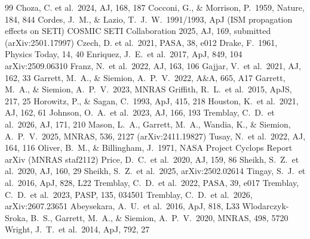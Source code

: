 \documentclass[10pt,twocolumn]{article}
\begin{document}
\begin{thebibliography}{99}
\footnotesize
{} Choza, C. et al.\ 2024, AJ, 168, 187
 Cocconi, G., \& Morrison, P.\ 1959, Nature, 184, 844
 Cordes, J.\ M., \& Lazio, T.\ J.\ W.\ 1991/1993, ApJ (ISM propagation effects on SETI)
 COSMIC SETI Collaboration 2025, AJ, 169, submitted (arXiv:2501.17997)
 Czech, D. et al.\ 2021, PASA, 38, e012
 Drake, F.\ 1961, Physics Today, 14, 40
 Enriquez, J.\ E.\ et al.\ 2017, ApJ, 849, 104
 arXiv:2509.06310
 Franz, N.\ et al.\ 2022, AJ, 163, 106
 Gajjar, V.\ et al.\ 2021, AJ, 162, 33
 Garrett, M.\ A., \& Siemion, A.\ P.\ V.\ 2022, A\&A, 665, A17
 Garrett, M.\ A., \& Siemion, A.\ P.\ V.\ 2023, MNRAS
 Griffith, R.\ L.\ et al.\ 2015, ApJS, 217, 25
 Horowitz, P., \& Sagan, C.\ 1993, ApJ, 415, 218
 Houston, K.\ et al.\ 2021, AJ, 162, 61
 Johnson, O.\ A.\ et al.\ 2023, AJ, 166, 193
 Tremblay, C.\ D.\ et al.\ 2026, AJ, 171, 210
 Mason, L.\ A., Garrett, M.\ A., Wandia, K., \& Siemion, A.\ P.\ V.\ 2025, MNRAS, 536, 2127 (arXiv:2411.19827)
 Tusay, N.\ et al.\ 2022, AJ, 164, 116
 Oliver, B.\ M., \& Billingham, J.\ 1971, NASA Project Cyclops Report
 arXiv (MNRAS staf2112)
 Price, D.\ C.\ et al.\ 2020, AJ, 159, 86
 Sheikh, S.\ Z.\ et al.\ 2020, AJ, 160, 29
 Sheikh, S.\ Z.\ et al.\ 2025, arXiv:2502.02614
 Tingay, S.\ J.\ et al.\ 2016, ApJ, 828, L22
 Tremblay, C.\ D.\ et al.\ 2022, PASA, 39, e017
 Tremblay, C.\ D.\ et al.\ 2023, PASP, 135, 034501
 Tremblay, C.\ D.\ et al.\ 2026, arXiv:2607.23651
 Abeysekara, A.\ U.\ et al.\ 2016, ApJ, 818, L33
 Wlodarczyk-Sroka, B.\ S., Garrett, M.\ A., \& Siemion, A.\ P.\ V.\ 2020, MNRAS, 498, 5720
 Wright, J.\ T.\ et al.\ 2014, ApJ, 792, 27
\end{thebibliography}
\end{document}
